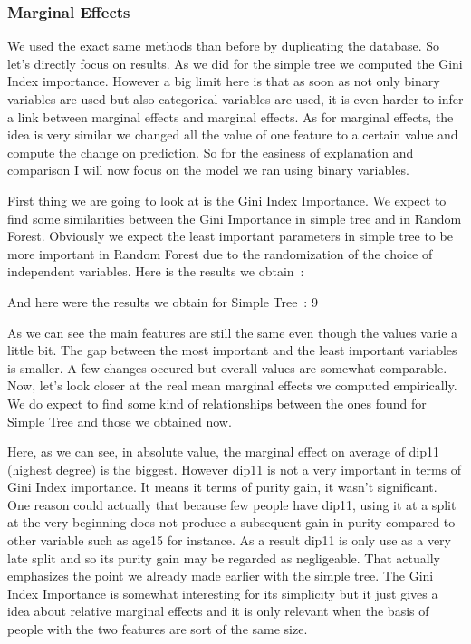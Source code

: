 \subsubsection{Marginal Effects}

We used the exact same methods than before by duplicating the database. So let’s directly focus on results.
As we did for the simple tree we computed the Gini Index importance.
However a big limit here is that as soon as not only binary variables are used but also categorical variables are used, it is even harder to infer a link between marginal effects and marginal effects. As for marginal effects, the idea is very similar we changed all the value of one feature to a certain value and compute the change on prediction.
So for the easiness of explanation and comparison I will now focus on the model we ran using binary variables.

First thing we are going to look at is the Gini Index Importance. We expect to find some similarities between the Gini Importance in simple tree and in Random Forest. Obviously we expect the least important parameters in simple tree to be more important in Random Forest due to the randomization of the choice of independent variables.
Here is the results we obtain :


And here were the results we obtain for Simple Tree :
9


As we can see the main features are still the same even though the values varie a little bit. The gap between the most important and the least important variables is smaller. A few changes occured but overall values are somewhat comparable.
Now, let’s look closer at the real mean marginal effects we computed empirically. We do expect to find some kind of relationships between the ones found for Simple Tree and those we obtained now.



Here, as we can see, in absolute value, the marginal effect on average of dip11 (highest degree) is the biggest. However dip11 is not a very important in terms of Gini Index importance. It means it terms of purity gain, it wasn’t significant. One reason could actually that because few people have dip11, using it at a split at the very beginning does not produce a subsequent gain in purity compared to other variable such as age15 for instance. As a result dip11 is only use as a very late split and so its purity gain may be regarded as negligeable. That actually emphasizes the point we already made earlier with the simple tree. The Gini Index Importance is somewhat interesting for its simplicity but it just gives a idea about relative marginal effects and it is only relevant when the basis of people with the two features are sort of the same size.

